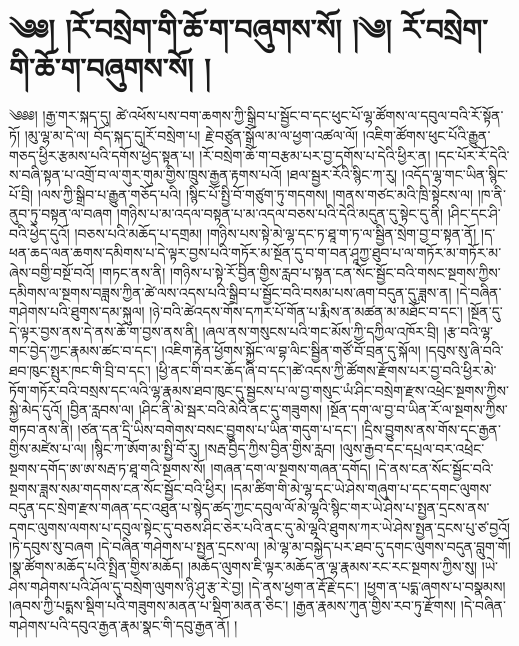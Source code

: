 \chapter{༄༅། །རོ་བསྲེག་གི་ཆོ་ག་བཞུགས་སོ། །༄། རོ་བསྲེག་གི་ཆོ་ག་བཞུགས་སོ། ། }༄༅༅། །རྒྱ་གར་སྐད་དུ། ཚེ་འཕོས་པས་བག་ཆགས་ཀྱི་སྒྲིབ་པ་སྦྱོང་བ་དང་ཕུང་པོ་ལྷ་ཚོགས་ལ་དབུལ་བའི་རོ་སྟོན་ཏོ། །མུ་ལྷ་མ་དེ་ལ། བོད་སྐད་དུ།རོ་བསྲེག་པ། རྗེ་བཙུན་སྒྲོལ་མ་ལ་ཕྱག་འཚལ་ལོ། །འཇིག་ཚོགས་ཕུང་པོའི་རྒྱུན་གཅད་ཕྱིར་རྩམས་པའི་དགོས་ཕྱེད་སྟན་པ། །རོ་བསྲེག་ཆོ་ག་བརྩམ་པར་བྱ་དགོས་པ་དེའི་ཕྱིར་ན། །དང་པོར་རོ་དེའི་ས་བཞི་སྟན་པ་འགྲོ་བ་ལ་གུར་གུམ་གྱིས་ཁྲུས་རྒྱན་རྟགས་པའོ། །ཐལ་སྦྱར་རོའི་སྙིང་ཀ་རུ། །འདོད་ལྷ་གང་ཡིན་སྙིང་པོ་བྲི། །ལས་ཀྱི་སྒྲིབ་པ་རྒྱུན་གཅོད་པའི། །སྙིང་པོ་སྤྱི་བོ་གཙུག་ཏུ་གདགས། །གནས་གཙང་མའི་ཁྲི་སྟེངས་ལ། །ཁ་ནི་ནུབ་ཏུ་བསྟན་ལ་བཞག །གཉིས་པ་མ་འདལ་བསྟན་པ་མ་འདལ་བཅས་པའི་དེའི་མདུན་དུ་སྟེང་དུ་ནི། །ཤིང་དང་ཤི་བའི་ཕྱེད་དུའོ། །བཅས་པའི་མཆོད་པ་དགྲམ། །གཉིས་པས་སྟེ་མེ་ལྷ་དང་ཏ་ཐཱ་ག་ཏ་ལ་སྦྱིན་སྲེག་བྱ་བ་སྟན་ནོ། །ད་ཕན་ཆད་ལན་ཆགས་དམིགས་པ་དེ་ལྟར་བྱས་པའི་གཏོར་མ་སྔོན་དུ་བ་ག་བན་ཤཱཀྱ་ཐུབ་པ་ལ་གཏོར་མ་གཏོར་མ་ཞེས་བགྱི་བསྔོ་བའོ། །གཏང་ནས་ནི། །གཉིས་པ་སྟེ་རོ་བྱིན་གྱིས་རླབ་པ་སྟན་ངན་སོང་སྦྱོང་བའི་གསང་སྔགས་ཀྱིས་དམིགས་ལ་སྔགས་བཟླས་ཀྱིན་ཚེ་ལས་འདས་པའི་སྒྲིབ་པ་སྦྱོང་བའི་བསམ་པས་ཞག་བདུན་དུ་ཟླས་ན། །དེ་བཞིན་གཤེགས་པའི་ཐུགས་དམ་སྐུལ། །ཉེ་བའི་ཚེའདས་གོས་དཀར་པོ་གོན་པ་རྨིས་ན་མཚན་མ་མཐོང་བ་དང་། །སྔོན་དུ་དེ་ལྟར་བྱས་ནས་དེ་ནས་ཆོ་ག་བྱས་ནས་ནི། །ཞལ་ནས་གསུངས་པའི་གང་མོས་ཀྱི་དཀྱིལ་འཁོར་བྲི། །རྩ་བའི་ལྷ་གང་བྱེད་ཀྱང་རྣམས་ཚང་བ་དང་། །འཇིག་རྟེན་ཕྱོགས་སྐྱོང་ལ་བྷ་ལིང་སྦྱིན་གཙོ་བོ་བྲན་དུ་སྐོལ། །དབུས་སུ་ཞི་བའི་ཐབ་ཁུང་སྤུར་ཁང་གི་བྲི་བ་དང་། །ཕྱི་ནང་གི་བར་ཆོད་ཞི་བ་དང་།ཚེ་འདས་ཀྱི་ཚོགས་རྫོགས་པར་བྱ་བའི་ཕྱིར་མེ་ཏོག་གཏོར་བའི་བསྲས་དང་ལའི་ལྷ་རྣམས་ཐབ་ཁུང་དུ་སྦྱངས་པ་ལ་བྱ་གསུང་ཡཾ་ཤིང་བསྲེག་རྫས་འཕྲེང་སྔགས་ཀྱིས་སྐྱེ་མེད་དུའོ། །བྱིན་རླབས་ལ། །ཤིང་ནི་མེ་སྦར་བའི་མེའི་ནང་དུ་གཟུགས། །སྔོན་དག་ལ་བྱ་བ་ཡིན་རོ་ལ་སྔགས་ཀྱིས་གཏབ་ནས་ནི། །ཙན་དན་དྲི་ཡིས་བགེགས་བསང་བྱུགས་པ་ཡིན་གདུག་པ་དང་། །དྲིས་བྱུགས་ནས་གོས་དང་རྒྱན་གྱིས་མཛེས་པ་ལ། །སྙིང་ཀ་ཨོག་མ་སྤྱི་བོ་རུ། །སརྦ་བྱིད་ཀྱིས་བྱིན་གྱིས་རླབ། །ལུས་རྒྱབ་དང་དཔྲལ་བར་འཕྲེང་སྔགས་དགོད་ཨ་ཨ་སརྦ་ཏ་ཐཱ་གའི་སྔགས་སོ། །གཞན་དག་ལ་སྔགས་གཞན་དགོད། །དེ་ནས་ངན་སོང་སྦྱོང་བའི་སྔགས་ཟླས་སམ་གདགས་ངན་སོང་སྦྱོང་བའི་ཕྱིར། །དམ་ཚིག་གི་མེ་ལྷ་དང་ཡེ་ཤེས་གཞུག་པ་དང་དགང་ལུགས་བདུན་དང་སྲེག་རྫས་གཞན་དང་འཐུན་པ་སྙེད་ཚད་ཀྱང་དབུལ་ལོ་མེ་ལྷའི་སྙིང་གར་ཡེ་ཤེས་པ་སྤྱན་དྲངས་ནས་དགང་ལུགས་ལགས་པ་དབུལ་སྟེང་དུ་བཅས་ཤིང་ཅེར་པའི་ནང་དུ་མེ་ལྷའི་ཐུགས་ཀར་ཡེ་ཤེས་སྤྱན་དྲངས་པུ་ཙ་བྱའོ། །ཏེ་དབུས་སུ་བཞག །དེ་བཞིན་གཤེགས་པ་སྤྱན་དྲངས་ལ། །མེ་ལྷ་མ་བསྐྱེད་པར་ཐབ་དུ་དགང་ལུགས་བདུན་བླུག་གོ། །སྣ་ཚོགས་མཆོད་པའི་སྤྲིན་གྱིས་མཆོད། །མཆོད་ལུགས་ཇི་ལྟར་མཆོད་ན་ལྷ་རྣམས་རང་རང་སྔགས་ཀྱིས་སུ། །ཡེ་ཤེས་གཤེགས་པའི་ཤོལ་དུ་བསྲེག་ལུགས་ཉི་ཤུ་རྩ་རེ་བྱ། །དེ་ནས་ཕྱག་ན་རྡོ་རྗེ་དང་། །ཕྱག་ན་པདྨ་ཞགས་པ་བསྣམས། །ཞབས་ཀྱི་པདྨས་སྡིག་པའི་གཟུགས་མནན་པ་སྡིག་མནན་ཅིང་། །རྒྱན་རྣམས་ཀུན་གྱིས་རབ་ཏུ་རྫོགས། །དེ་བཞིན་གཤེགས་པའི་དབུའ་རྒྱན་རྣམ་སྣང་གི་དབུ་རྒྱན་ནོ། །
